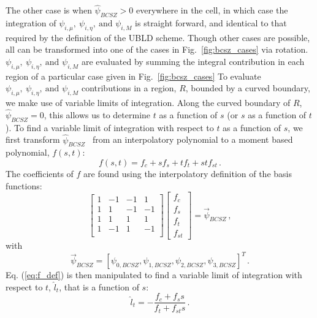 \documentclass{mc2015}
\newcommand{\fig}[1]{Fig.~\ref{#1}}                      %
\newcommand{\benum}{\begin{equation}} 			%
\newcommand{\eenum}{\end{equation}}
\newcommand{\eqt}[1]{Eq. (\ref{#1})}  %
\newcommand{\BCSZH}{\ensuremath{\widehat{\psi}_{BCSZ}}}
\newcommand{\pec}{\, ,}
\newcommand{\pep}{\, .}
\begin{document}
The other case is when $\BCSZH > 0$ everywhere in the cell, in which case the integration of $\psi_{i,\mu},~\psi_{i,\eta},~\text{and }\psi_{i,M}$ is straight forward, and identical to that required by the definition of the UBLD scheme.
Though other cases are possible, all can be transformed into one of the cases in \fig{fig:bcsz_cases} via rotation.
$\psi_{i,\mu},~\psi_{i,\eta},~\text{and }\psi_{i,M}$ are evaluated by summing the integral contribution in  each region of a particular case given in \fig{fig:bcsz_cases}
To evaluate $\psi_{i,\mu},~\psi_{i,\eta},~\text{and }\psi_{i,M}$ contributions in a region, $R$, bounded by a curved boundary, we make use of variable limits of integration.
Along the curved boundary of $R$, $\BCSZH=0$, this allows us to determine $t$ as a function of $s$ (or $s$ as a function of $t$).  
To find a variable limit of integration with respect to $t$ as a function of $s$, we first transform \BCSZH~ from an interpolatory polynomial to a moment based polynomial, $f(s,t)$:
\benum
f(s,t) = f_c + s f_s + t f_t + st f_{st} \pep
\label{eq:f_def}
\eenum
The coefficients of $f$ are found using the interpolatory definition of the basis functions:
\benum
\left[ 
\begin{array}{cccc}
1 &	 -1	& -1 &  1    \\
1 &		1	& -1	&  -1		\\	
1 &	  1	&  1		&  1		\\
1 &		-1	& 1		&  -1		\\
\end{array}
\right]
\left[
\begin{array}{c}
f_c \\
f_s \\
f_t \\
f_{st} 
\end{array}
\right]
=\vec{\psi}_{BCSZ}
\pec
\eenum
with
\benum
\vec{\psi}_{BCSZ} = \left[ \psi_{0,BCSZ},
\psi_{1,BCSZ},
\psi_{2,BCSZ},
\psi_{3,BCSZ} \right]^T
\pep
\eenum
\eqt{eq:f_def} is then manipulated to find a variable limit of integration with respect to $t$, $\hat{l}_t$, that is a function of $s$:
\benum
\hat{l}_t  = -\frac{f_c + f_s s}{f_t + f_{st} s} \pep
\eenum
\end{document}

